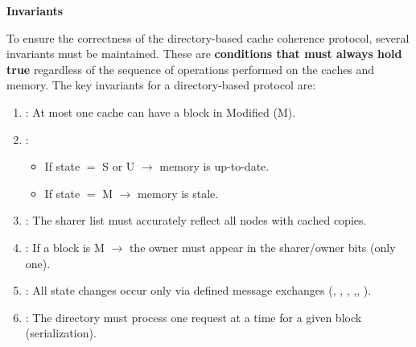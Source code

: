 \begin{flushleft}
    \textcolor{Red2}{ \textbf{Invariants}}
\end{flushleft}
To ensure the correctness of the directory-based cache coherence protocol, several invariants must be maintained. These are \textbf{conditions that must always hold true} regardless of the sequence of operations performed on the caches and memory. The key invariants for a directory-based protocol are:
\begin{enumerate}
    \item {}: At most one cache can have a block in Modified (M).
    \item {}:
    \begin{itemize}
        \item[\textcolor{Green3}{\faIcon{check}}] If state $=$ S or U $\to$ memory is up-to-date.
        \item[\textcolor{Red2}{\faIcon{times}}] If state $=$ M $\to$ memory is stale.
    \end{itemize}
    \item {}: The sharer list must accurately reflect all nodes with cached copies.
    \item {}: If a block is M $\to$ the owner must appear in the sharer/owner bits (only one).
    \item {}: All state changes occur only via defined message exchanges (, , , ,\break {}, ).
    \item {}: The directory must process one request at a time for a given block (serialization).
\end{enumerate}